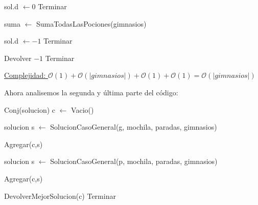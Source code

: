 \begin{algorithm}[H]
\label{}
\begin{algorithmic}[]

 
	\State sol.d $\leftarrow 0$ 
	\State Terminar 
\EndIf

\State suma $\leftarrow$ SumaTodasLasPociones(gimnasios) 

 
	\State sol.d $\leftarrow -1$ 
	\State Terminar
\EndIf

 
	\State Devolver $-1$ 
	\State Terminar
\EndIf

\medskip
\Statex \underline{Complejidad: $\mathcal{O}(1) + \mathcal{O}(|gimnasios|) + \mathcal{O}(1) + \mathcal{O}(1) = \mathcal{O}(|gimnasios|)$}
\end{algorithmic}
\end{algorithm}

Ahora analisemos la segunda y última parte del código:

\begin{algorithm}[H]
\label{}
\begin{algorithmic}[]

\State Conj(solucion) c $\leftarrow$ Vacio()



		\State solucion s $\leftarrow$ SolucionCasoGeneral(g, mochila, paradas, gimnasios)

		\State Agregar(c,s)

	\EndFor

\Else


		\State solucion s $\leftarrow$ SolucionCasoGeneral(p, mochila, paradas, gimnasios)

		\State Agregar(c,s)

	\EndFor

\EndIf

\State DevolverMejorSolucion(c)
\State Terminar

\medskip
\Statex \underline{}
\end{algorithmic}
\end{algorithm}

